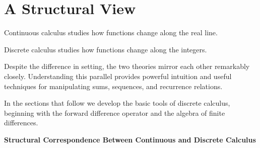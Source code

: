 \section*{A Structural View}

Continuous calculus studies how functions change along the real line.

Discrete calculus studies how functions change along the integers.

Despite the difference in setting, the two theories mirror each other
remarkably closely. Understanding this parallel provides powerful intuition and
useful techniques for manipulating sums, sequences, and recurrence relations.

In the sections that follow we develop the basic tools of discrete calculus,
beginning with the forward difference operator and the algebra of finite
differences.

\begin{center}
\textbf{Structural Correspondence Between Continuous and Discrete Calculus}
\end{center}

\begin{center}
\end{center}



